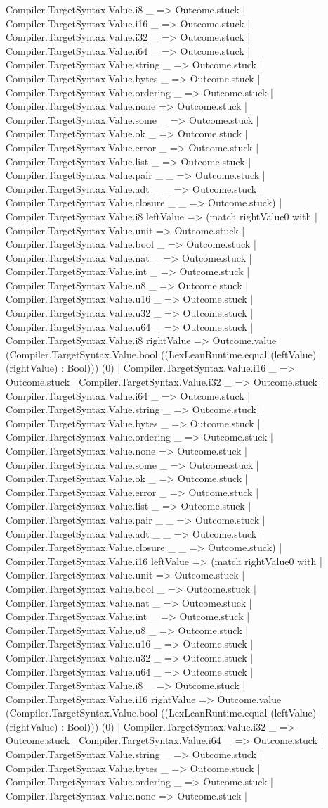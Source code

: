 \documentclass[11pt]{article}
\begin{document}
Compiler.TargetSyntax.Value.i8 \_ => Outcome.stuck | Compiler.TargetSyntax.Value.i16 \_ => Outcome.stuck | Compiler.TargetSyntax.Value.i32 \_ => Outcome.stuck | Compiler.TargetSyntax.Value.i64 \_ => Outcome.stuck | Compiler.TargetSyntax.Value.string \_ => Outcome.stuck | Compiler.TargetSyntax.Value.bytes \_ => Outcome.stuck | Compiler.TargetSyntax.Value.ordering \_ => Outcome.stuck | Compiler.TargetSyntax.Value.none => Outcome.stuck | Compiler.TargetSyntax.Value.some \_ => Outcome.stuck | Compiler.TargetSyntax.Value.ok \_ => Outcome.stuck | Compiler.TargetSyntax.Value.error \_ => Outcome.stuck | Compiler.TargetSyntax.Value.list \_ => Outcome.stuck | Compiler.TargetSyntax.Value.pair \_ \_ => Outcome.stuck | Compiler.TargetSyntax.Value.adt \_ \_ => Outcome.stuck | Compiler.TargetSyntax.Value.closure \_ \_ => Outcome.stuck) | Compiler.TargetSyntax.Value.i8 leftValue => (match rightValue0 with | Compiler.TargetSyntax.Value.unit => Outcome.stuck | Compiler.TargetSyntax.Value.bool \_ => Outcome.stuck | Compiler.TargetSyntax.Value.nat \_ => Outcome.stuck | Compiler.TargetSyntax.Value.int \_ => Outcome.stuck | Compiler.TargetSyntax.Value.u8 \_ => Outcome.stuck | Compiler.TargetSyntax.Value.u16 \_ => Outcome.stuck | Compiler.TargetSyntax.Value.u32 \_ => Outcome.stuck | Compiler.TargetSyntax.Value.u64 \_ => Outcome.stuck | Compiler.TargetSyntax.Value.i8 rightValue => Outcome.value (Compiler.TargetSyntax.Value.bool ((LexLeanRuntime.equal (leftValue) (rightValue) : Bool))) (0) | Compiler.TargetSyntax.Value.i16 \_ => Outcome.stuck | Compiler.TargetSyntax.Value.i32 \_ => Outcome.stuck | Compiler.TargetSyntax.Value.i64 \_ => Outcome.stuck | Compiler.TargetSyntax.Value.string \_ => Outcome.stuck | Compiler.TargetSyntax.Value.bytes \_ => Outcome.stuck | Compiler.TargetSyntax.Value.ordering \_ => Outcome.stuck | Compiler.TargetSyntax.Value.none => Outcome.stuck | Compiler.TargetSyntax.Value.some \_ => Outcome.stuck | Compiler.TargetSyntax.Value.ok \_ => Outcome.stuck | Compiler.TargetSyntax.Value.error \_ => Outcome.stuck | Compiler.TargetSyntax.Value.list \_ => Outcome.stuck | Compiler.TargetSyntax.Value.pair \_ \_ => Outcome.stuck | Compiler.TargetSyntax.Value.adt \_ \_ => Outcome.stuck | Compiler.TargetSyntax.Value.closure \_ \_ => Outcome.stuck) | Compiler.TargetSyntax.Value.i16 leftValue => (match rightValue0 with | Compiler.TargetSyntax.Value.unit => Outcome.stuck | Compiler.TargetSyntax.Value.bool \_ => Outcome.stuck | Compiler.TargetSyntax.Value.nat \_ => Outcome.stuck | Compiler.TargetSyntax.Value.int \_ => Outcome.stuck | Compiler.TargetSyntax.Value.u8 \_ => Outcome.stuck | Compiler.TargetSyntax.Value.u16 \_ => Outcome.stuck | Compiler.TargetSyntax.Value.u32 \_ => Outcome.stuck | Compiler.TargetSyntax.Value.u64 \_ => Outcome.stuck | Compiler.TargetSyntax.Value.i8 \_ => Outcome.stuck | Compiler.TargetSyntax.Value.i16 rightValue => Outcome.value (Compiler.TargetSyntax.Value.bool ((LexLeanRuntime.equal (leftValue) (rightValue) : Bool))) (0) | Compiler.TargetSyntax.Value.i32 \_ => Outcome.stuck | Compiler.TargetSyntax.Value.i64 \_ => Outcome.stuck | Compiler.TargetSyntax.Value.string \_ => Outcome.stuck | Compiler.TargetSyntax.Value.bytes \_ => Outcome.stuck | Compiler.TargetSyntax.Value.ordering \_ => Outcome.stuck | Compiler.TargetSyntax.Value.none => Outcome.stuck | 
\end{document}
